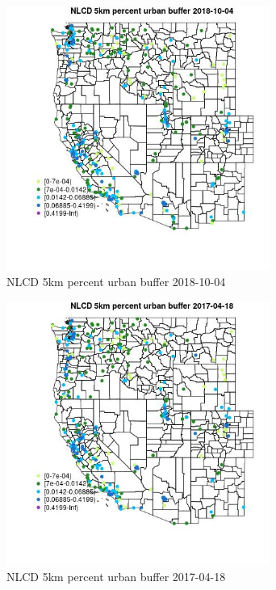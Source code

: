 \begin{figure} 
\centering  
\includegraphics[width=0.77\textwidth]{Code_Outputs/Report_ML_input_PM25_Step4_part_f_de_duplicated_aveswNAs_MapObsNLCD_5km_percent_urban_buffer2018-10-04.jpg} 
\caption{\label{fig:Report_ML_input_PM25_Step4_part_f_de_duplicated_aveswNAsMapObsNLCD_5km_percent_urban_buffer2018-10-04}NLCD 5km percent urban buffer 2018-10-04} 
\end{figure} 
 

\clearpage 

\begin{figure} 
\centering  
\includegraphics[width=0.77\textwidth]{Code_Outputs/Report_ML_input_PM25_Step4_part_f_de_duplicated_aveswNAs_MapObsNLCD_5km_percent_urban_buffer2017-04-18.jpg} 
\caption{\label{fig:Report_ML_input_PM25_Step4_part_f_de_duplicated_aveswNAsMapObsNLCD_5km_percent_urban_buffer2017-04-18}NLCD 5km percent urban buffer 2017-04-18} 
\end{figure} 
 

